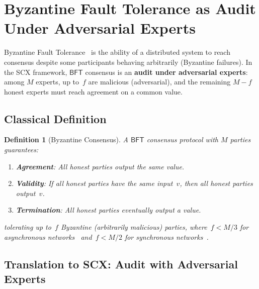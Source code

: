 \documentclass[12pt,a4paper]{article}
\newtheorem{definition}[theorem]{Definition}
\theoremstyle{remark}
\newcommand{\SCX}{\textsf{SCX}}
\newcommand{\BFT}{\textsf{BFT}}
\begin{document}
\section{Byzantine Fault Tolerance as Audit Under Adversarial Experts}
\label{sec:bft}

Byzantine Fault Tolerance~\cite{lamport1982byzantine} is the ability of a distributed system to reach consensus despite some participants behaving arbitrarily (Byzantine failures). In the \SCX{} framework, $\BFT$ consensus is an \textbf{audit under adversarial experts}: among $M$ experts, up to~$f$ are malicious (adversarial), and the remaining $M-f$ honest experts must reach agreement on a common value.

\subsection{Classical Definition}

\begin{definition}[Byzantine Consensus]
\label{def:bft}
A $\BFT$ consensus protocol with $M$ parties guarantees:
\begin{enumerate}[leftmargin=*, label=(\roman*)]
  \item \textbf{Agreement}: All honest parties output the same value.
  \item \textbf{Validity}: If all honest parties have the same input~$v$, then all honest parties output~$v$.
  \item \textbf{Termination}: All honest parties eventually output a value.
\end{enumerate}
tolerating up to~$f$ Byzantine (arbitrarily malicious) parties, where~$f < M/3$ for asynchronous networks~\cite{bracha1987asynchronous} and~$f < M/2$ for synchronous networks~\cite{dolev1982unanimity}.
\end{definition}

\subsection{Translation to SCX: Audit with Adversarial Experts}
\end{document}

